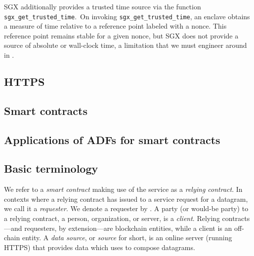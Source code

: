 SGX additionally provides a trusted time source via the function \texttt{sgx\_get\_trusted\_time}.~On invoking \texttt{sgx\_get\_trusted\_time}, an enclave obtains a measure of time relative to a reference point labeled with a nonce. This reference point remains stable for a given nonce, but SGX does not provide a source of absolute or wall-clock time, a limitation that we must engineer around in \tc.

\subsection{HTTPS}
\subsection{Smart contracts}

\subsection{Applications of ADFs for smart contracts}
\subsection{Basic terminology}
We refer to a {\em smart contract} making use of the \tcs service as a \emph{relying contract}. In contexts where a relying contract has issued to \tc a service request for a datagram, we call it a \emph{requester}. We denote a requester by \reqcont. A party (or would-be party) to a relying contract, a person, organization, or server, is a \emph{client}. Relying contracts---and requesters, by extension---are blockchain entities, while a client is an off-chain entity. A \emph{data source}, or \emph{source} for short, is an online server (running HTTPS) that provides data which \tc uses to compose datagrams.


